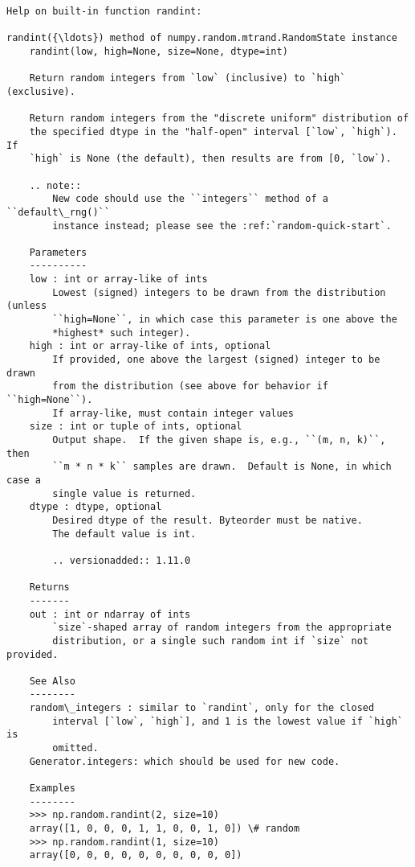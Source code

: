 \documentclass[11pt]{article}
\begin{document}
    \begin{Verbatim}[commandchars=\\\{\}]
Help on built-in function randint:

randint({\ldots}) method of numpy.random.mtrand.RandomState instance
    randint(low, high=None, size=None, dtype=int)

    Return random integers from `low` (inclusive) to `high` (exclusive).

    Return random integers from the "discrete uniform" distribution of
    the specified dtype in the "half-open" interval [`low`, `high`). If
    `high` is None (the default), then results are from [0, `low`).

    .. note::
        New code should use the ``integers`` method of a ``default\_rng()``
        instance instead; please see the :ref:`random-quick-start`.

    Parameters
    ----------
    low : int or array-like of ints
        Lowest (signed) integers to be drawn from the distribution (unless
        ``high=None``, in which case this parameter is one above the
        *highest* such integer).
    high : int or array-like of ints, optional
        If provided, one above the largest (signed) integer to be drawn
        from the distribution (see above for behavior if ``high=None``).
        If array-like, must contain integer values
    size : int or tuple of ints, optional
        Output shape.  If the given shape is, e.g., ``(m, n, k)``, then
        ``m * n * k`` samples are drawn.  Default is None, in which case a
        single value is returned.
    dtype : dtype, optional
        Desired dtype of the result. Byteorder must be native.
        The default value is int.

        .. versionadded:: 1.11.0

    Returns
    -------
    out : int or ndarray of ints
        `size`-shaped array of random integers from the appropriate
        distribution, or a single such random int if `size` not provided.

    See Also
    --------
    random\_integers : similar to `randint`, only for the closed
        interval [`low`, `high`], and 1 is the lowest value if `high` is
        omitted.
    Generator.integers: which should be used for new code.

    Examples
    --------
    >>> np.random.randint(2, size=10)
    array([1, 0, 0, 0, 1, 1, 0, 0, 1, 0]) \# random
    >>> np.random.randint(1, size=10)
    array([0, 0, 0, 0, 0, 0, 0, 0, 0, 0])


\end{Verbatim}
\end{document}

